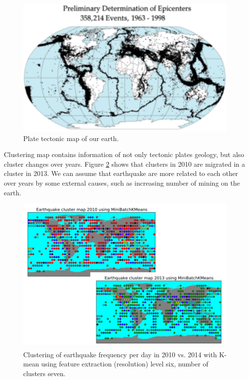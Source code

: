 \documentclass{article}
\begin{document}
\begin{figure}
\includegraphics[width=0.99\textwidth]{../earthquakedata/output_map_plot/Tectonic_plates_boundaries.png}
\caption{Plate tectonic map of our earth.}
\label{PlateWorldMap}
\end{figure}

Clustering map contains information of not only tectonic plates geology, but also cluster changes over years. 
Figure \ref{Cluster2010vs.2013} shows that clusters in 2010 are migrated in a cluster in 2013. We can assume that earthquake are more related to each other over years by some external causes, such as increasing number of mining on the earth.

\begin{figure}[H]
\centering
\includegraphics[width=0.99\textwidth]{../earthquakedata/output_map_plot/MiniBatchKMeans(year=2010,2013,level=6,number_of_cluster=7).png}
\caption{Clustering of earthquake frequency per day in 2010 vs. 2014 with K-mean
using feature extraction (resolution) level six, number of clusters seven.}
\label{Cluster2010vs.2013}
\end{figure}
\end{document}
